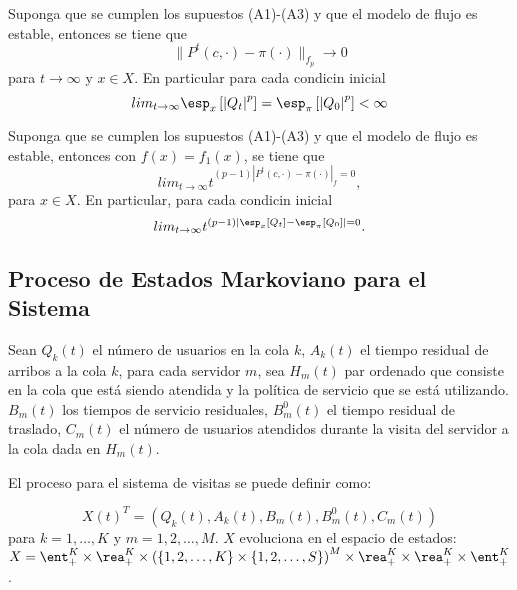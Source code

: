 \begin{Teo}\label{Tma.6.2}
Suponga que se cumplen los supuestos (A1)-(A3) y que el modelo de
flujo es estable, entonces se tiene que
\[\parallel P^{t}\left(c,\cdot\right)-\pi\left(\cdot\right)\parallel_{f_{p}}\rightarrow0\]
para $t\rightarrow\infty$ y $x\in X$. En particular para cada
condicin inicial
\[lim_{t\rightarrow\infty}\esp_{x}\left[\left|Q_{t}\right|^{p}\right]=\esp_{\pi}\left[\left|Q_{0}\right|^{p}\right]<\infty\]
\end{Teo}


\begin{Teo}\label{Tma.6.3}
Suponga que se cumplen los supuestos (A1)-(A3) y que el modelo de
flujo es estable, entonces con
$f\left(x\right)=f_{1}\left(x\right)$, se tiene que
\[lim_{t\rightarrow\infty}t^{(p-1)\left|P^{t}\left(c,\cdot\right)-\pi\left(\cdot\right)\right|_{f}=0},\]
para $x\in X$. En particular, para cada condicin inicial
\[lim_{t\rightarrow\infty}t^{(p-1)\left|\esp_{x}\left[Q_{t}\right]-\esp_{\pi}\left[Q_{0}\right]\right|=0}.\]
\end{Teo}



\subsection{Proceso de Estados Markoviano para el Sistema}


Sean $Q_{k}\left(t\right)$ el n\'umero de usuarios en la cola $k$,
$A_{k}\left(t\right)$ el tiempo residual de arribos a la cola $k$,
para cada servidor $m$, sea $H_{m}\left(t\right)$ par ordenado que
consiste en la cola que est\'a siendo atendida y la pol\'itica de
servicio que se est\'a utilizando. $B_{m}\left(t\right)$ los
tiempos de servicio residuales, $B_{m}^{0}\left(t\right)$ el
tiempo residual de traslado, $C_{m}\left(t\right)$ el n\'umero de
usuarios atendidos durante la visita del servidor a la cola dada
en $H_{m}\left(t\right)$.

El proceso para el sistema de visitas se puede definir como:

\begin{equation}\label{Esp.Edos.Down}
X\left(t\right)^{T}=\left(Q_{k}\left(t\right),A_{k}\left(t\right),B_{m}\left(t\right),B_{m}^{0}\left(t\right),C_{m}\left(t\right)\right)
\end{equation}
para $k=1,\ldots,K$ y $m=1,2,\ldots,M$. $X$ evoluciona en el
espacio de estados:
$X=\ent_{+}^{K}\times\rea_{+}^{K}\times\left(\left\{1,2,\ldots,K\right\}\times\left\{1,2,\ldots,S\right\}\right)^{M}\times\rea_{+}^{K}\times\rea_{+}^{K}\times\ent_{+}^{K}$.\\

